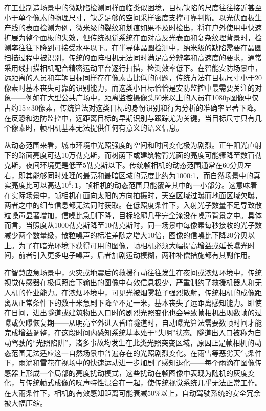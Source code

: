 在工业制造场景中的微缺陷检测同样面临类似困境，目标缺陷的尺度往往接近甚至小于单个像素的物理尺寸，缺乏足够的空间采样密度支撑可靠判断。以光伏面板生产线的表面检测为例，微米级的裂纹和划痕如果不及时检出，将在户外使用中快速扩展为整个面板的失效，但传统视觉系统在面对高反光表面和复杂纹理背景时，检测率往往下降到可接受水平以下。在半导体晶圆检测中，纳米级的缺陷需要在晶圆扫描过程中被识别，传统的面阵相机无法同时满足高分辨率和高速度的要求，通常采用线扫描相机配合精密运动平台逐行扫描，检测效率低下。在智能安防场景中，远距离的人员和车辆目标同样存在像素占比低的问题，传统方法在目标尺寸小于20像素时基本丧失可靠的识别能力，而这类小目标恰恰是安防监控中最需要关注的对象——例如在大型公共广场中，距离监控摄像头50米以上的人员在1080p图像中仅占约15$\times$30像素，传统算法对这类目标的身份识别和行为分析的准确率显著下降。在反恐和边防监控中，远距离目标的早期识别与跟踪尤为关键，当目标尺寸只有几个像素时，帧相机基本无法提供任何有意义的语义信息。

从动态范围来看，城市环境中光照强度的空间和时间变化极为剧烈。正午阳光直射下的路面亮度可达10万勒克斯，而树荫下或建筑物背光面的亮度可能骤降至数百勒克斯，夜间环境更是低至5勒克斯以下。传统帧相机的动态范围通常在60分贝左右，即其能够同时处理的最亮和最暗区域的亮度比约为1000:1，而自然场景中的真实亮度比可以高达$10^6:1$，帧相机的动态范围只能覆盖其中的一小部分。这意味着在实际场景中，帧相机在面向太阳的方向拍摄时，天空区域过曝而地面区域欠曝，两者之中的细节信息都无法同时获取。在低照度条件下，入射光子数量不足导致散粒噪声显著增加，信噪比急剧下降，目标轮廓几乎完全淹没在噪声背景之中。具体而言，当照度从1000勒克斯降至10勒克斯时，同一场景中每像素每秒接收的光子数减少两个数量级，散粒噪声的标准差随之增大10倍，图像的信噪比下降20分贝以上。为了在暗光环境下获得可用的图像，帧相机必须大幅提高增益或延长曝光时间，前者引入更多电子噪声，后者加剧运动模糊，两种补偿措施都有其副作用。

在智慧应急场景中，火灾或地震后的救援行动往往发生在夜间或浓烟环境中，传统视觉传感器在极低照度下输出的图像中有效信息极少，严重制约了救援机器人和无人机的作业能力。在浓烟环境中，可见光被烟雾粒子强烈散射，传统相机的成像距离从正常条件下的数十米急剧下降至不足一米，基本丧失了远距离感知能力。即使在日间，进出隧道或建筑物出入口时的剧烈光照变化也会导致帧相机出现数帧的过曝或欠曝恢复期——从明亮室外进入昏暗隧道时，自动曝光算法需要数帧时间才能完成增益调整，在这段时间内感知系统基本处于“失明”状态。隧道出入口被称为自动驾驶的“光照陷阱”，诸多事故均发生在此类光照突变区域，原因正是帧相机的动态范围无法适应这一自然场景中普遍存在的光照剧烈变化。在雨雪等恶劣天气条件下，雨滴和雪花在视场中的快速运动进一步加剧了感知退化——每个雨滴在图像传感器上形成一个局部的亮度扰动模式，这些扰动在帧图像中表现为随机的灰度变化，与传统帧式成像的噪声特性混合在一起，使传统视觉系统几乎无法正常工作。在大雨条件下，相机的有效感知距离可能衰减50\%以上，自动驾驶系统的安全冗余被大幅压缩。

